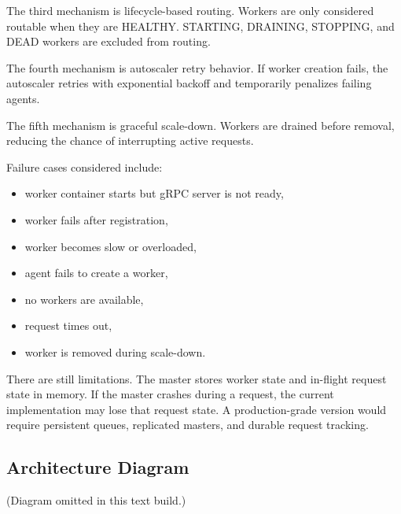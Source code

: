 The third mechanism is lifecycle-based routing. Workers are only considered routable when they are HEALTHY. STARTING, DRAINING, STOPPING, and DEAD workers are excluded from routing.

The fourth mechanism is autoscaler retry behavior. If worker creation fails, the autoscaler retries with exponential backoff and temporarily penalizes failing agents.

The fifth mechanism is graceful scale-down. Workers are drained before removal, reducing the chance of interrupting active requests.

Failure cases considered include:
\begin{itemize}[leftmargin=1.5em]
  \item worker container starts but gRPC server is not ready,
  \item worker fails after registration,
  \item worker becomes slow or overloaded,
  \item agent fails to create a worker,
  \item no workers are available,
  \item request times out,
  \item worker is removed during scale-down.
\end{itemize}

There are still limitations. The master stores worker state and in-flight request state in memory. If the master crashes during a request, the current implementation may lose that request state. A production-grade version would require persistent queues, replicated masters, and durable request tracking.

\subsection{Architecture Diagram}
(Diagram omitted in this text build.)
